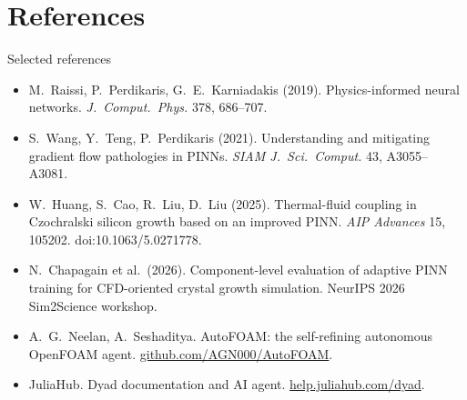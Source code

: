 \documentclass[aspectratio=169,10pt,t]{beamer}
\newcommand{\weblink}[2]{\href{#1}{\textcolor{qblue}{#2}}}
\begin{document}
\section*{References}
\begin{frame}{Selected references}
\scriptsize
\begin{itemize}\setlength{\itemsep}{2pt}
  \item M.~Raissi, P.~Perdikaris, G.~E.~Karniadakis (2019). Physics-informed neural networks. \emph{J.\ Comput.\ Phys.} 378, 686--707.
  \item S.~Wang, Y.~Teng, P.~Perdikaris (2021). Understanding and mitigating gradient flow pathologies in PINNs. \emph{SIAM J.\ Sci.\ Comput.} 43, A3055--A3081.
  \item W.~Huang, S.~Cao, R.~Liu, D.~Liu (2025). Thermal-fluid coupling in Czochralski silicon growth based on an improved PINN. \emph{AIP Advances} 15, 105202. doi:10.1063/5.0271778.
  \item N.~Chapagain et al.\ (2026). Component-level evaluation of adaptive PINN training for CFD-oriented crystal growth simulation. NeurIPS 2026 Sim2Science workshop.
  \item A.~G.~Neelan, A.~Seshaditya. AutoFOAM: the self-refining autonomous OpenFOAM agent. \weblink{https://github.com/AGN000/AutoFOAM}{github.com/AGN000/AutoFOAM}.
  \item JuliaHub. Dyad documentation and AI agent. \weblink{https://help.juliahub.com/dyad/stable/}{help.juliahub.com/dyad}.
\end{itemize}
\end{frame}
\end{document}
